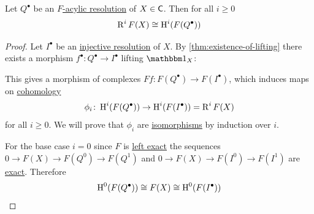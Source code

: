 \documentclass[../../main]{subfiles}
\begin{document}
\begin{theorem}\label{thm:right-derived-functor-using-acyclics}
  Let \(Q^{\bullet}\) be an \hyperref[def:F-acyclic-object]{\(F\)-acylic resolution} of \(X \in \mathsf{C}\).
  Then for all \(i \geq 0\)
  \begin{equation*}
    \operatorname{R}^{i}F(X) \cong \operatorname{H}^{i}(F(Q^{\bullet}))
  \end{equation*}
\end{theorem}
\begin{proof}
  Let \(I^{\bullet}\) be an \hyperref[def:resolution]{injective resolution} of \(X\).
  By \autoref{thm:existence-of-lifting} there exists a morphism \(f^{\bullet}\colon Q^{\bullet} \to I^{\bullet}\) lifting \(\id_{X}\):
  \begin{center}
  \end{center}
  This gives a morphism of complexes \(Ff\colon F(Q^{\bullet}) \to F(I^{\bullet})\), which induces maps on \hyperref[def:cohomology]{cohomology}
  \begin{equation*}
    \phi_{i}\colon \operatorname{H}^{i}(F(Q^{\bullet})) \to \operatorname{H}^{i}(F(I^{\bullet})) = \operatorname{R}^{i}F(X)
  \end{equation*}
  for all \(i \geq 0\).
  We will prove that \(\phi_{i}\) are \hyperref[def:categorical-isomorphism]{isomorphisms} by induction over \(i\).

  For the base case \(i = 0\) since \(F\) is \hyperref[def:exact-functor]{left exact} the sequences \(0 \to F(X) \to F(Q^{0}) \to F(Q^{1})\) and \(0 \to F(X) \to F(I^{0}) \to F(I^{1})\) are \hyperref[def:exact-sequence]{exact}.
  Therefore
  \begin{equation*}
    \operatorname{H}^{0}(F(Q^{\bullet})) \cong F(X) \cong \operatorname{H}^{0}(F(I^{\bullet}))
  \end{equation*}


\end{proof}
\end{document}
